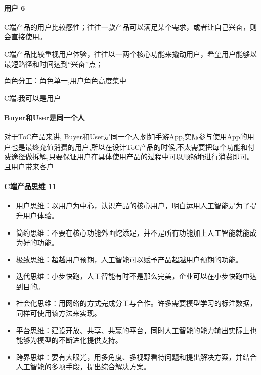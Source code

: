 \documentclass[letterpaper,11pt,english]{sphinxmanual}
\begin{document}
\paragraph{用户 6\sphinxfootnotemark[75]}
\label{\detokenize{chapter_introduction/2C:id6}}%
\begin{footnotetext}[75]\sphinxAtStartFootnote
{}
%
\end{footnotetext}\ignorespaces 
C端产品的用户比较感性；往往一款产品可以满足某个需求，或者让自己兴奋，则会直接使用。

C端产品比较重视用户体验，往往以一两个核心功能来撬动用户，希望用户能够以最短路径和时间达到“兴奋”点；

角色分工：角色单一,用户角色高度集中

C端:我可以是用户


\paragraph{Buyer和User是同一个人}
\label{\detokenize{chapter_introduction/2C:buyeruser}}
对于ToC产品来讲,
Buyer和User是同一个人,例如手游App,实际参与使用App的用户也是最终充值消费的用户,所以在设计ToC产品的时候,不太需要把每个功能和付费途径做拆解,只要保证用户在具体使用产品的过程中可以顺畅地进行消费即可。且用户带来客户


\paragraph{C端产品思维 11\sphinxfootnotemark[76]}
\label{\detokenize{chapter_introduction/2C:c-11}}%
\begin{footnotetext}[76]\sphinxAtStartFootnote
{}
%
\end{footnotetext}\ignorespaces \begin{itemize}
\item {} 
用户思维：以用户为中心，认识产品的核心用户，明白运用人工智能是为了提升用户体验。

\item {} 
简约思维：不要在核心功能外画蛇添足，并不是所有功能加上人工智能就能成为好的功能。

\item {} 
极致思维：超越用户预期，人工智能可以赋予产品超越用户预期的功能。

\item {} 
迭代思维：小步快跑，人工智能有时不是那么完美，企业可以在小步快跑中达到目的。

\item {} 
社会化思维：用网络的方式完成分工与合作。许多需要模型学习的标注数据，同样可使用该方法来实现。

\item {} 
平台思维：建设开放、共享、共赢的平台，同时人工智能的能力输出实际上也能够为模型的不断进化提供支持。

\item {} 
跨界思维：要有大眼光，用多角度、多视野看待问题和提出解决方案，并结合人工智能的多项手段，提出综合解决方案。

\end{itemize}
\end{document}
